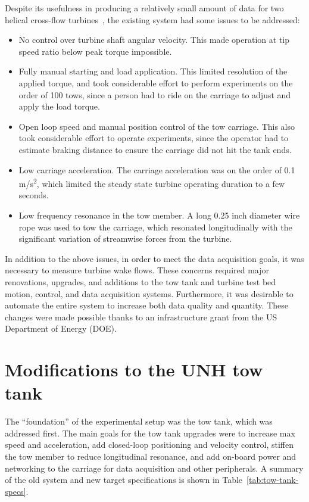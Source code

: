 Despite its usefulness in producing a relatively small amount of data for two
helical cross-flow turbines~\cite{Bachant2015-RE}, the existing system had some
issues to be addressed:
\begin{itemize}
    \item No control over turbine shaft angular velocity. This made operation at
    tip speed ratio below peak torque impossible.
    
    \item Fully manual starting and load application. This limited resolution of
    the applied torque, and took considerable effort to perform experiments on
    the order of 100 tows, since a person had to ride on the carriage to adjust
    and apply the load torque.
    
    \item Open loop speed and manual position control of the tow carriage. This
    also took considerable effort to operate experiments, since the operator had
    to estimate braking distance to ensure the carriage did not hit the tank
    ends.
    
    \item Low carriage acceleration. The carriage acceleration was on the order
    of 0.1 m/s\textsuperscript{2}, which limited the steady state turbine
    operating duration to a few seconds.
    
    \item Low frequency resonance in the tow member. A long 0.25 inch diameter
    wire rope was used to tow the carriage, which resonated longitudinally with
    the significant variation of streamwise forces from the turbine.
\end{itemize}

In addition to the above issues, in order to meet the data acquisition goals, it
was necessary to measure turbine wake flows. These concerns required major
renovations, upgrades, and additions to the tow tank and turbine test bed
motion, control, and data acquisition systems. Furthermore, it was desirable to
automate the entire system to increase both data quality and quantity. These
changes were made possible thanks to an infrastructure grant from the US
Department of Energy (DOE).


\section{Modifications to the UNH tow tank}

The ``foundation'' of the experimental setup was the tow tank, which was
addressed first. The main goals for the tow tank upgrades were to increase max
speed and acceleration, add closed-loop positioning and velocity control,
stiffen the tow member to reduce longitudinal resonance, and add on-board power
and networking to the carriage for data acquisition and other peripherals. A
summary of the old system and new target specifications is shown in
Table~\ref{tab:tow-tank-specs}.

